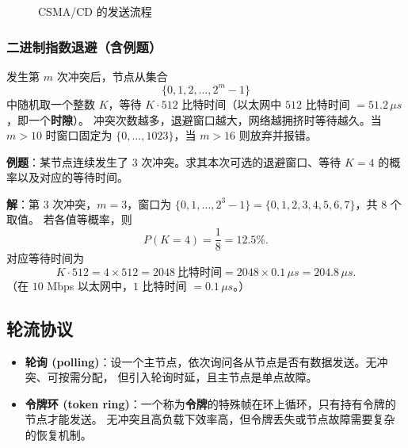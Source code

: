 \begin{figure}[H]
\centering
{}
\caption{CSMA/CD 的发送流程}
\label{fig:csmacd_flow}
\end{figure}

\subsubsection{二进制指数退避（含例题）}

发生第 $m$ 次冲突后，节点从集合
\[
\{0,1,2,\dots,2^{m}-1\}
\]
中随机取一个整数 $K$，等待 $K \cdot 512$ 比特时间（以太网中 $512$ 比特时间 $=51.2\,\mu s$，即一个\textbf{时隙}）。
冲突次数越多，退避窗口越大，网络越拥挤时等待越久。当 $m>10$ 时窗口固定为 $\{0,\dots,1023\}$，当 $m>16$ 则放弃并报错。

\noindent\textbf{例题}：某节点连续发生了 3 次冲突。求其本次可选的退避窗口、等待 $K=4$ 的概率以及对应的等待时间。

\noindent\textbf{解}：第 3 次冲突，$m=3$，窗口为 $\{0,1,\dots,2^3-1\}=\{0,1,2,3,4,5,6,7\}$，共 $8$ 个取值。
若各值等概率，则
\[
P(K=4) = \frac{1}{8} = 12.5\%.
\]
对应等待时间为
\[
K\cdot 512 = 4\times 512 = 2048\ \text{比特时间} = 2048 \times 0.1\,\mu s = 204.8\,\mu s.
\]
（在 $10$ Mbps 以太网中，$1$ 比特时间 $=0.1\,\mu s$。）

\subsection{轮流协议}

\begin{itemize}
    \item \textbf{轮询 (polling)}：设一个主节点，依次询问各从节点是否有数据发送。无冲突、可按需分配，
        但引入轮询时延，且主节点是单点故障。
    \item \textbf{令牌环 (token ring)}：一个称为\textbf{令牌}的特殊帧在环上循环，只有持有令牌的节点才能发送。
        无冲突且高负载下效率高，但令牌丢失或节点故障需要复杂的恢复机制。
\end{itemize}

